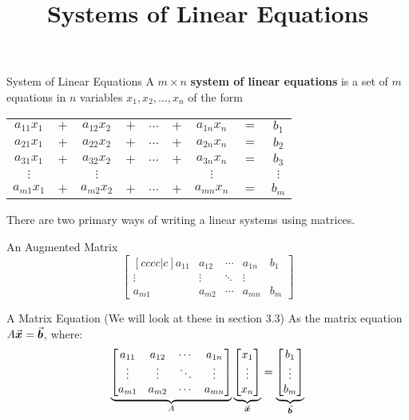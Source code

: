 \documentclass{beamer}
\title[MA245 - Section 3.2]{Systems of Linear Equations}
\begin{document}
\begin{frame}
  \titlepage
\end{frame}

\begin{frame}
\begin{block}{System of Linear Equations}
A $m\times n$ \textbf{system of linear equations} is a set of $m$ equations in $n$ variables $x_1,x_2,\dots,x_n$ of the form
\begin{center}
\begin{tabular}{ccccccccc}
$a_{11}x_1$&$+$&$a_{12}x_2$&$+$&$\dots$&$+$&$a_{1n}x_n$&$=$&$b_1$\\
$a_{21}x_1$&$+$&$a_{22}x_2$&$+$&$\dots$&$+$&$a_{2n}x_n$&$=$&$b_2$\\
$a_{31}x_1$&$+$&$a_{32}x_2$&$+$&$\dots$&$+$&$a_{3n}x_n$&$=$&$b_3$\\
$\vdots$&&$\vdots$&&&&$\vdots$&&$\vdots$\\
$a_{m1}x_1$&$+$&$a_{m2}x_2$&$+$&$\dots$&$+$&$a_{mn}x_n$&$=$&$b_m$\\
\end{tabular}
\end{center}
\end{block}
\end{frame}

\begin{frame}
\begin{block}{}
There are two primary ways of writing a linear systems using matrices.
\end{block}\pause
\begin{block}{An Augmented Matrix}
\begin{equation*}
\begin{bmatrix}[cccc|c]
a_{11}&a_{12}&\cdots&a_{1n}&b_1\\
\vdots&\vdots&\ddots&\vdots&\\
a_{m1}&a_{m2}&\cdots&a_{mn}&b_m
\end{bmatrix}
\end{equation*}
\end{block}\pause
\begin{block}{A Matrix Equation (We will look at these in section 3.3)}
As the matrix equation $A{\vec{\boldsymbol{x}}}={\vec{\boldsymbol{b}}}$, where:
\begin{equation*}
\underbrace{\begin{bmatrix}
a_{11}&a_{12}&\cdots&a_{1n}\\
\vdots&\vdots&\ddots&\vdots\\
a_{m1}&a_{m2}&\cdots&a_{mn}
\end{bmatrix}}_A
\underbrace{\begin{bmatrix}
x_1\\\vdots\\x_n
\end{bmatrix}}_{\vec{\boldsymbol{x}}}
=
\underbrace{\begin{bmatrix}
b_1\\\vdots\\b_m
\end{bmatrix}}_{\vec{\boldsymbol{b}}}
\end{equation*}
\end{block}
\end{frame}
\end{document}
